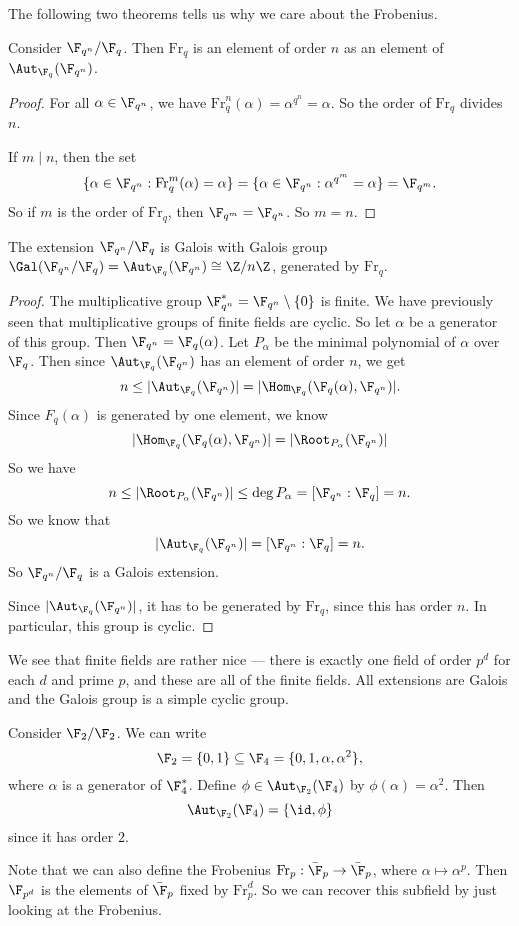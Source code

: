 \documentclass[a4paper]{article}
\newcommand\Fr{\mathrm{Fr}}
\begin{document}
The following two theorems tells us why we care about the Frobenius.
\begin{thm}
  Consider $\F_{q^n}/\F_q$. Then $\Fr_q$ is an element of order $n$ as an element of $\Aut_{\F_q}(\F_{q^n})$.
\end{thm}

\begin{proof}
  For all $\alpha \in \F_{q^n}$, we have $\Fr_q^n (\alpha) = \alpha^{q^n} = \alpha$. So the order of $\Fr_q$ divides $n$.

  If $m \mid n$, then the set
  \[
    \{\alpha \in \F_{q^n} : \Fr_q^m (\alpha) = \alpha\} = \{\alpha \in \F_{q^n}: \alpha^{q^m} = \alpha\} = \F_{q^m}.
  \]
  So if $m$ is the order of $\Fr_q$, then $\F_{q^m} = \F_{q^n}$. So $m = n$.
\end{proof}

\begin{thm}
  The extension $\F_{q^n}/\F_q$ is Galois with Galois group $\Gal(\F_{q^n}/\F_q) = \Aut_{\F_q}(\F_{q^n}) \cong \Z/n\Z$, generated by $\Fr_q$.
\end{thm}

\begin{proof}
  The multiplicative group $\F_{q^n}^* = \F_{q^n} \setminus \{0\}$ is finite. We have previously seen that multiplicative groups of finite fields are cyclic. So let $\alpha$ be a generator of this group. Then $\F_{q^n} = \F_q(\alpha)$. Let $P_\alpha$ be the minimal polynomial of $\alpha$ over $\F_q$. Then since $\Aut_{\F_q}(\F_{q^n})$ has an element of order $n$, we get
  \[
    n \leq |\Aut_{\F_q}(\F_{q^n})| = |\Hom_{\F_q}(\F_q(\alpha), \F_{q^n})|.
  \]
  Since $F_q(\alpha)$ is generated by one element, we know
  \[
    |\Hom_{\F_q}(\F_q(\alpha), \F_{q^n})| = |\Root_{P_\alpha}(\F_{q^n})|
  \]
  So we have
  \[
    n \leq |\Root_{P_\alpha}(\F_{q^n})| \leq \deg P_\alpha = [\F_{q^n}: \F_q] = n.
  \]
  So we know that
  \[
    |\Aut_{\F_q}(\F_{q^n})| = [\F_{q^n} : \F_q] = n.
  \]
  So $\F_{q^n}/\F_q$ is a Galois extension.

  Since $|\Aut_{\F_q}(\F_{q^n})|$, it has to be generated by $\Fr_q$, since this has order $n$. In particular, this group is cyclic.
\end{proof}
We see that finite fields are rather nice --- there is exactly one field of order $p^d$ for each $d$ and prime $p$, and these are all of the finite fields. All extensions are Galois and the Galois group is a simple cyclic group.

\begin{eg}
  Consider $\F_2/\F_2$. We can write
  \[
    \F_2 = \{0, 1\} \subseteq \F_4 = \{0, 1, \alpha, \alpha^2\},
  \]
  where $\alpha$ is a generator of $\F_4^*$. Define $\phi \in \Aut_{\F_2}(\F_4)$ by $\phi(\alpha) = \alpha^2$. Then
  \[
    \Aut_{\F_2}(\F_4) = \{\id, \phi\}
  \]
  since it has order $2$.
\end{eg}
Note that we can also define the Frobenius $\Fr_p: \bar{\F}_p \to \bar{\F}_p$, where $\alpha \mapsto \alpha^p$. Then $\F_{p^d}$ is the elements of $\bar{\F}_p$ fixed by $\Fr_p^d$. So we can recover this subfield by just looking at the Frobenius.
\end{document}
